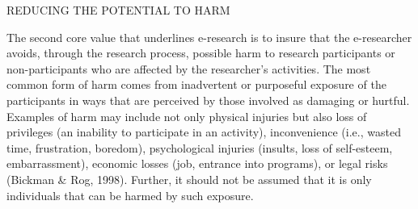 \documentclass[]{article}
\begin{document}
REDUCING THE POTENTIAL TO HARM

The second core value that underlines e-research is to insure that the
e-researcher avoids, through the research process, possible harm to
research participants or non-participants who are affected by the
researcher's activities. The most common form of harm comes from
inadvertent or purposeful exposure of the participants in ways that are
perceived by those involved as damaging or hurtful. Examples of harm may
include not only physical injuries but also loss of privileges (an
inability to participate in an activity), inconvenience (i.e., wasted
time, frustration, boredom), psychological injuries (insults, loss of
self-esteem, embarrassment), economic losses (job, entrance into
programs), or legal risks (Bickman \& Rog, 1998). Further, it should not
be assumed that it is only individuals that can be harmed by such
exposure.
\end{document}
